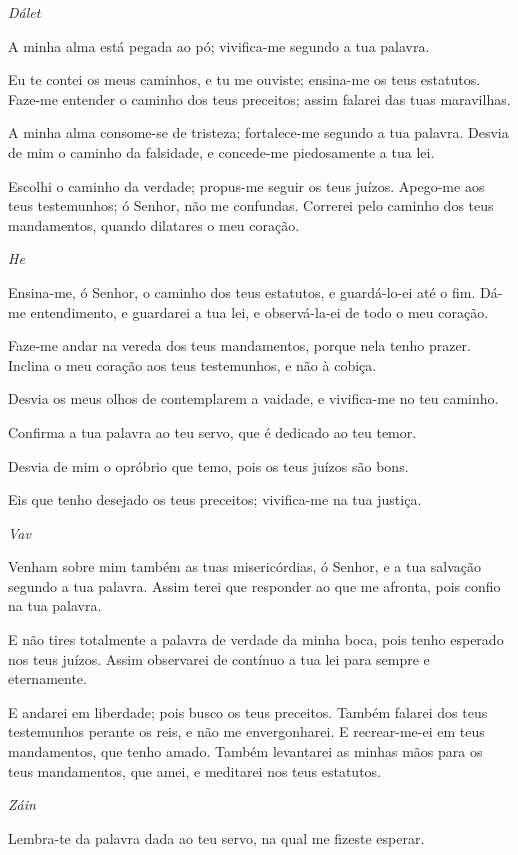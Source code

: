 \bigskip
\centerline{\emph{Dálet}}

A minha alma está pegada ao pó; vivifica-me segundo a tua
palavra.

Eu te contei os meus caminhos, e tu me ouviste; ensina-me os teus
estatutos. Faze-me entender o caminho dos teus preceitos;
assim falarei das tuas maravilhas.

A minha alma consome-se de tristeza; fortalece-me segundo a tua
palavra. Desvia de mim o caminho da falsidade, e concede-me
piedosamente a tua lei.

Escolhi o caminho da verdade; propus-me seguir os teus juízos.
Apego-me aos teus testemunhos; ó Senhor, não me confundas.
Correrei pelo caminho dos teus mandamentos, quando dilatares
o meu coração.

\bigskip
\centerline{\emph{He}}

Ensina-me, ó Senhor, o caminho dos teus estatutos, e guardá-lo-ei
até o fim. Dá-me entendimento, e guardarei a tua lei, e
observá-la-ei de todo o meu coração.

Faze-me andar na vereda dos teus mandamentos, porque nela tenho
prazer. Inclina o meu coração aos teus testemunhos, e não à
cobiça.

Desvia os meus olhos de contemplarem a vaidade, e vivifica-me no
teu caminho.

Confirma a tua palavra ao teu servo, que é dedicado ao teu temor.

Desvia de mim o opróbrio que temo, pois os teus juízos são bons.

Eis que tenho desejado os teus preceitos; vivifica-me na tua
justiça.

\bigskip
\centerline{\emph{Vav}}

Venham sobre mim também as tuas misericórdias, ó Senhor, e a tua
salvação segundo a tua palavra. Assim terei que responder ao
que me afronta, pois confio na tua palavra.

E não tires totalmente a palavra de verdade da minha boca, pois
tenho esperado nos teus juízos. Assim observarei de contínuo
a tua lei para sempre e eternamente.

E andarei em liberdade; pois busco os teus preceitos.
Também falarei dos teus testemunhos perante os reis, e não me
envergonharei. E recrear-me-ei em teus mandamentos, que tenho
amado. Também levantarei as minhas mãos para os teus
mandamentos, que amei, e meditarei nos teus estatutos.

\bigskip
\centerline{\emph{Záin}}

Lembra-te da palavra dada ao teu servo, na qual me fizeste
esperar.


